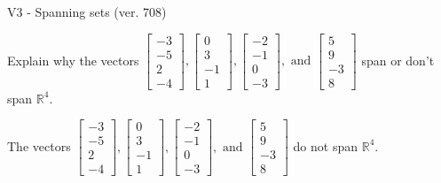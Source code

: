 \begin{exercise}
  \begin{exerciseTitle}V3 - Spanning sets (ver. 708)\end{exerciseTitle}
  \begin{exerciseStatement}
    Explain why the vectors \(\left[\begin{array}{r}
-3 \\
-5 \\
2 \\
-4
\end{array}\right] , \left[\begin{array}{r}
0 \\
3 \\
-1 \\
1
\end{array}\right] , \left[\begin{array}{r}
-2 \\
-1 \\
0 \\
-3
\end{array}\right] , \text{ and } \left[\begin{array}{r}
5 \\
9 \\
-3 \\
8
\end{array}\right]\) span or don't span \(\mathbb{R}^4\). 
	


  \end{exerciseStatement}
  \begin{exerciseAnswer}
   The vectors \(\left[\begin{array}{r}
-3 \\
-5 \\
2 \\
-4
\end{array}\right] , \left[\begin{array}{r}
0 \\
3 \\
-1 \\
1
\end{array}\right] , \left[\begin{array}{r}
-2 \\
-1 \\
0 \\
-3
\end{array}\right] , \text{ and } \left[\begin{array}{r}
5 \\
9 \\
-3 \\
8
\end{array}\right]\) 
  	 do not  
	span \(\mathbb{R}^4\).
  


  \end{exerciseAnswer}
\end{exercise}